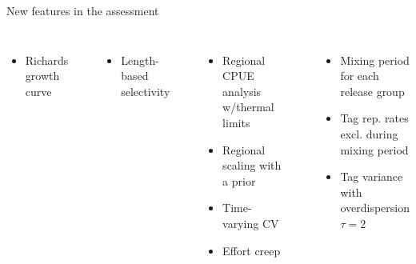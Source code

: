\documentclass[aspectratio=169]{beamer}
\begin{document}
\begin{frame}{New features in the assessment}
\begin{columns}[T]
\begin{itemize}
      \item[\gray-~] {\gray Richards growth curve}\\[1.4ex]
    \end{itemize}
    \phantom{Selectivity}\\[-0.8ex]
    \begin{itemize}\setlength\itemsep{-0.1ex}
      \item[\gray-~] {\gray Length-based selectivity}\\[1.4ex]
    \end{itemize}
    \phantom{CPUE}\\[-0.8ex]
    \begin{itemize}\setlength\itemsep{-0.1ex}
      \item[\faCheck] {\darkgreen Regional CPUE analysis w/thermal limits}
      \item[\faCheck] {\darkgreen Regional scaling with a prior}
      \item[\faCheck] {\darkgreen Time-varying CV}
      \item[\faCheck] {\darkgreen Effort creep}
    \end{itemize}
    \phantom{Tags}\\[-0.8ex]
    \begin{itemize}\setlength\itemsep{-0.1ex}
      \item[\gray-~] {\gray Mixing period for each release group}
      \item[{\bf +}] {\darkgreen Tag rep. rates excl. during mixing period}
      \item[{\bf +}] {\darkgreen Tag variance with overdispersion
        $\tau\!=\!2$}\\[1.4ex]
    \end{itemize}
  \end{columns}
\end{frame}

\end{document}

